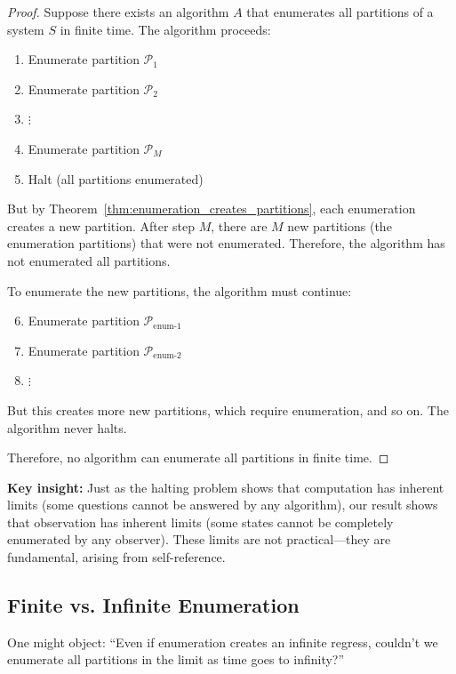 \documentclass[twocolumn,10pt]{article}
\theoremstyle{definition}
\theoremstyle{remark}
\begin{document}
\begin{proof}
Suppose there exists an algorithm $A$ that enumerates all partitions of a system $S$ in finite time. The algorithm proceeds:
\begin{enumerate}
\item Enumerate partition $\mathcal{P}_1$
\item Enumerate partition $\mathcal{P}_2$
\item $\vdots$
\item Enumerate partition $\mathcal{P}_M$
\item Halt (all partitions enumerated)
\end{enumerate}

But by Theorem~\ref{thm:enumeration_creates_partitions}, each enumeration creates a new partition. After step $M$, there are $M$ new partitions (the enumeration partitions) that were not enumerated. Therefore, the algorithm has not enumerated all partitions.

To enumerate the new partitions, the algorithm must continue:
\begin{enumerate}
\setcounter{enumi}{5}
\item Enumerate partition $\mathcal{P}_{\text{enum-1}}$
\item Enumerate partition $\mathcal{P}_{\text{enum-2}}$
\item $\vdots$
\end{enumerate}

But this creates more new partitions, which require enumeration, and so on. The algorithm never halts.

Therefore, no algorithm can enumerate all partitions in finite time.
\end{proof}

\noindent\textbf{Key insight:} Just as the halting problem shows that computation has inherent limits (some questions cannot be answered by any algorithm), our result shows that observation has inherent limits (some states cannot be completely enumerated by any observer). These limits are not practical—they are fundamental, arising from self-reference.

\subsection{Finite vs. Infinite Enumeration}

One might object: ``Even if enumeration creates an infinite regress, couldn't we enumerate all partitions in the limit as time goes to infinity?''
\end{document}
